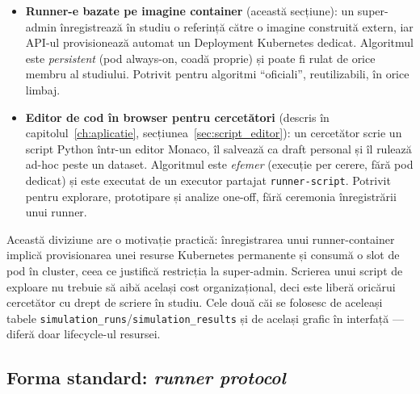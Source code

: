 \begin{itemize}
    \item \textbf{Runner-e bazate pe imagine container} (această secțiune):
          un super-admin înregistrează în studiu o referință către o imagine
          construită extern, iar API-ul provisionează automat un Deployment
          Kubernetes dedicat. Algoritmul este \emph{persistent} (pod always-on,
          coadă proprie) și poate fi rulat de orice membru al studiului.
          Potrivit pentru algoritmi ``oficiali'', reutilizabili, în orice
          limbaj.
    \item \textbf{Editor de cod în browser pentru cercetători} (descris în
          capitolul~\ref{ch:aplicatie},
          secțiunea~\ref{sec:script_editor}): un cercetător scrie un script
          Python într-un editor Monaco, îl salvează ca draft personal și
          îl rulează ad-hoc peste un dataset. Algoritmul este \emph{efemer}
          (execuție per cerere, fără pod dedicat) și este executat de un
          executor partajat \texttt{runner-script}. Potrivit pentru explorare,
          prototipare și analize one-off, fără ceremonia înregistrării unui
          runner.
\end{itemize}

Această diviziune are o motivație practică: înregistrarea unui runner-container
implică provisionarea unei resurse Kubernetes permanente și consumă o slot de
pod în cluster, ceea ce justifică restricția la super-admin. Scrierea unui
script de exploare nu trebuie să aibă același cost organizațional, deci este
liberă oricărui cercetător cu drept de scriere în studiu. Cele două căi se
folosesc de aceleași tabele \texttt{simulation\_runs}/\texttt{simulation\_results}
și de același grafic în interfață --- diferă doar lifecycle-ul resursei.

\subsection{Forma standard: \emph{runner protocol}}
\label{subsec:plugin_contract}

